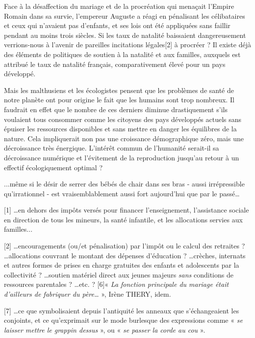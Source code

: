  Face à la désaffection du mariage et de la procréation qui menaçait l'Empire Romain dans sa survie, l'empereur Auguste a réagi en pénalisant les célibataires et ceux qui n'avaient pas d'enfants, et ses lois ont été appliquées sans faillir pendant au moins trois siècles. Si les taux de natalité baissaient dangereusement verrions-nous à l'avenir de pareilles incitations légales[2] à procréer ? Il existe déjà des éléments de politiques de soutien à la natalité et aux familles, auxquels est attribué le taux de natalité français, comparativement élevé pour un pays développé.
 
 Mais les malthusiens et les écologistes pensent que les problèmes de santé de notre planète ont pour origine le fait que les humains sont trop nombreux. Il faudrait en effet que le nombre de ces derniers diminue drastiquement s'ils voulaient tous consommer comme les citoyens des pays développés actuels sans épuiser les ressources disponibles et sans mettre en danger les équilibres de la nature. Cela impliquerait non pas une croissance démographique zéro, mais une décroissance très énergique. L'intérêt commun de l'humanité serait-il sa décroissance numérique et l'évitement de la reproduction jusqu'au retour à un effectif écologiquement optimal ? 
 
 ...même si le désir de serrer des bébés de chair dans ses bras - aussi irrépressible qu'irrationnel - est vraisemblablement aussi fort aujourd'hui que par le passé…
 
 
 
[1] …en dehors des impôts versés pour financer l'enseignement, l'assistance sociale en direction de tous les mineurs, la santé infantile, et les allocations servies aux familles...

[2] …encouragements (ou/et pénalisation) par l'impôt ou le calcul des retraites ? …allocations couvrant le montant des dépenses d'éducation ? …crèches, internats et autres formes de prises en charge gratuites des enfants et adolescents par la collectivité ? …soutien matériel direct aux jeunes majeurs \emph{sans} conditions de ressources parentales ? …etc. ?
[6]« \emph{La fonction principale du mariage était d'ailleurs de fabriquer du père…} », Irène THERY, idem.

[7] …ce que symbolisaient depuis l'antiquité les anneaux que s'échangeaient les conjoints, et ce qu'exprimait sur le mode burlesque des expressions comme « \emph{se laisser mettre le grappin dessus} », ou « \emph{se passer la corde au cou} ».
